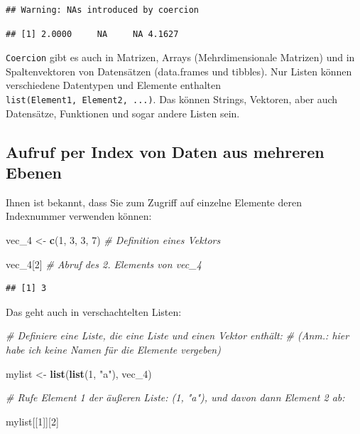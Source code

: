 \documentclass[
  ngerman,
]{book}
\newenvironment{Shaded}{\begin{snugshade}}{\end{snugshade}}
\newcommand{\CommentTok}[1]{\textcolor[rgb]{0.56,0.35,0.01}{\textit{#1}}}
\newcommand{\DecValTok}[1]{\textcolor[rgb]{0.00,0.00,0.81}{#1}}
\newcommand{\FunctionTok}[1]{\textcolor[rgb]{0.13,0.29,0.53}{\textbf{#1}}}
\newcommand{\NormalTok}[1]{#1}
\newcommand{\OtherTok}[1]{\textcolor[rgb]{0.56,0.35,0.01}{#1}}
\newcommand{\StringTok}[1]{\textcolor[rgb]{0.31,0.60,0.02}{#1}}
\begin{document}
\begin{verbatim}
## Warning: NAs introduced by coercion
\end{verbatim}

\begin{verbatim}
## [1] 2.0000     NA     NA 4.1627
\end{verbatim}

\texttt{Coercion} gibt es auch in Matrizen, Arrays (Mehrdimensionale Matrizen) und in Spaltenvektoren von Datensätzen (data.frames und tibbles). Nur Listen können verschiedene Datentypen und Elemente enthalten \texttt{list(Element1,\ Element2,\ ...)}. Das können Strings, Vektoren, aber auch Datensätze, Funktionen und sogar andere Listen sein.

\subsection{Aufruf per Index von Daten aus mehreren Ebenen}\label{aufruf-per-index-von-daten-aus-mehreren-ebenen}

Ihnen ist bekannt, dass Sie zum Zugriff auf einzelne Elemente deren Indexnummer verwenden können:

\begin{Shaded}
\begin{Highlighting}[]
\NormalTok{vec\_4 }\OtherTok{\textless{}{-}} \FunctionTok{c}\NormalTok{(}\DecValTok{1}\NormalTok{, }\DecValTok{3}\NormalTok{, }\DecValTok{3}\NormalTok{, }\DecValTok{7}\NormalTok{) }\CommentTok{\# Definition eines Vektors}

\NormalTok{vec\_4[}\DecValTok{2}\NormalTok{]            }\CommentTok{\# Abruf des 2. Elements von vec\_4   }
\end{Highlighting}
\end{Shaded}

\begin{verbatim}
## [1] 3
\end{verbatim}

Das geht auch in verschachtelten Listen:

\begin{Shaded}
\begin{Highlighting}[]
\CommentTok{\# Definiere eine Liste, die eine Liste und einen Vektor enthält:}
\CommentTok{\# (Anm.: hier habe ich keine Namen für die Elemente vergeben)}

\NormalTok{mylist }\OtherTok{\textless{}{-}} \FunctionTok{list}\NormalTok{(}\FunctionTok{list}\NormalTok{(}\DecValTok{1}\NormalTok{, }\StringTok{"a"}\NormalTok{),}
\NormalTok{               vec\_4)}

\CommentTok{\# Rufe Element 1 der äußeren Liste: (1, "a"), und davon dann Element 2 ab:}

\NormalTok{mylist[[}\DecValTok{1}\NormalTok{]][}\DecValTok{2}\NormalTok{]}
\end{Highlighting}
\end{Shaded}
\end{document}
